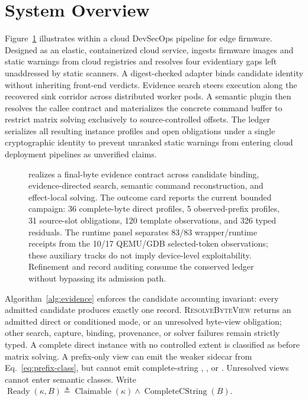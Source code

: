 \section{System Overview}
\label{sec:overview}

Figure~\ref{fig:architecture} illustrates \tool within a cloud DevSecOps pipeline for edge firmware. Designed as an elastic, containerized cloud service, \tool ingests firmware images and static warnings from cloud registries and resolves four evidentiary gaps left unaddressed by static scanners. A digest-checked adapter binds candidate identity without inheriting front-end verdicts. Evidence search steers execution along the recovered sink corridor across distributed worker pods. A semantic plugin then resolves the callee contract and materializes the concrete command buffer to restrict matrix solving exclusively to source-controlled offsets. The ledger serializes all resulting instance profiles and open obligations under a single cryptographic identity to prevent unranked static warnings from entering cloud deployment pipelines as unverified claims.

\begin{figure}[!t]
\centering

\caption{\tool realizes a final-byte evidence contract across candidate
binding, evidence-directed search, semantic command reconstruction, and
effect-local solving. The outcome card reports the current bounded campaign:
36 complete-byte direct profiles, 5 observed-prefix profiles, 31 source-slot
obligations, 120 template observations, and 326 typed residuals. The runtime
panel separates 83/83 wrapper/runtime receipts from the 10/17 QEMU/GDB
selected-token observations; these auxiliary tracks do not imply device-level
exploitability. Refinement and record auditing consume the conserved ledger
without bypassing its admission path.}
\label{fig:architecture}
\end{figure}

Algorithm~\ref{alg:evidence} enforces the candidate accounting invariant: every admitted candidate produces exactly one record. \textsc{ResolveByteView} returns an admitted direct or conditioned mode, or an unresolved byte-view obligation; other search, capture, binding, provenance, or solver failures remain strictly typed. A complete direct instance with no controlled extent is classified as \nms before matrix solving. A prefix-only view can emit the weaker \psat sidecar from Eq.~\ref{eq:prefix-class}, but cannot emit complete-string \svsat, \mfilt, or \nms. Unresolved views cannot enter semantic classes. Write $\operatorname{Ready}(\kappa,B)\triangleq\operatorname{Claimable}(\kappa)\land\operatorname{CompleteCString}(B)$.

